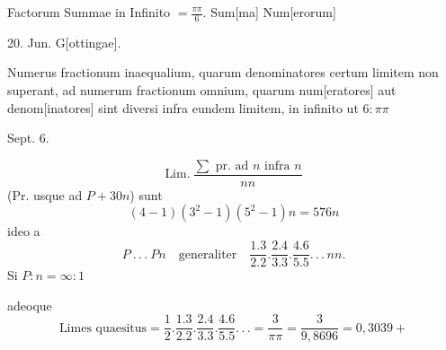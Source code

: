\par\indent Factorum Summae in Infinito \(=\frac{\pi\pi}{6}\). Sum[ma] Num[erorum]
\begin{flushright}[1796] 20. Jun. G[ottingae].\end{flushright}
\ClosingRule
{}
\par\indent Numerus fractionum inaequalium, quarum denominatores certum limitem non superant, ad numerum fractionum omnium, quarum num[eratores] aut denom[inatores] sint diversi infra eundem limitem, in infinito ut \(6:\pi\pi\)
\begin{flushright}[1796] Sept. 6.\end{flushright}
\ClosingRule
\clearpage
{}
\[
\text{Lim.}\ \frac{\sum\text{ pr. ad }n\text{ infra }n}{nn}
\]
\noindent (Pr. usque ad \(P+30n\)) sunt
\[
(4-1)(3^2-1)(5^2-1)n=576n
\]
\noindent ideo a
\[
P\ .\,.\,.\ Pn\quad\text{generaliter}\quad
\frac{1.3}{2.2}.\frac{2.4}{3.3}.\frac{4.6}{5.5}.\,.\,.\,nn.
\]
\noindent Si \(P:n=\infty:1\)
\par\noindent adeoque
\[
\text{Limes quaesitus}=\frac12.\frac{1.3}{2.2}.\frac{2.4}{3.3}.\frac{4.6}{5.5}.\,.\,.
=\frac3{\pi\pi}=\frac3{9,8696}=0,3039+
\]
